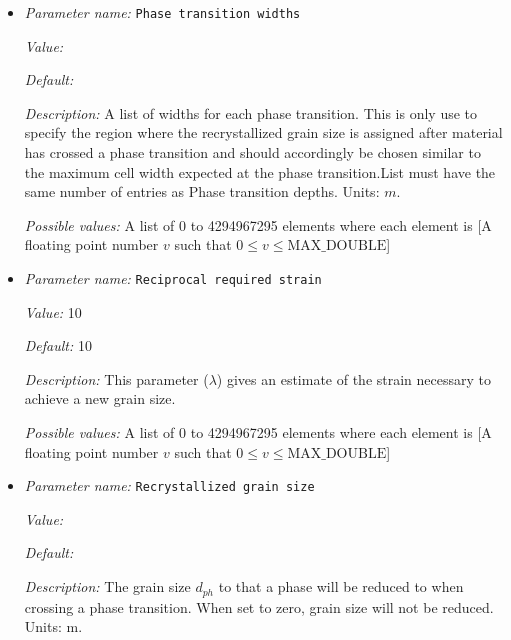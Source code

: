 \begin{itemize}
{\it Possible values:} A list of 0 to 4294967295 elements where each element is [A floating point number $v$ such that $0 \leq v \leq \text{MAX\_DOUBLE}$]
\item {\it Parameter name:} {\tt Phase transition widths}
\label{parameters:Material model/Grain size model/Phase transition widths}


{\it Value:} 


{\it Default:} 


{\it Description:} A list of widths for each phase transition. This is only use to specify the region where the recrystallized grain size is assigned after material has crossed a phase transition and should accordingly be chosen similar to the maximum cell width expected at the phase transition.List must have the same number of entries as Phase transition depths. Units: $m$.


{\it Possible values:} A list of 0 to 4294967295 elements where each element is [A floating point number $v$ such that $0 \leq v \leq \text{MAX\_DOUBLE}$]
\item {\it Parameter name:} {\tt Reciprocal required strain}
\label{parameters:Material model/Grain size model/Reciprocal required strain}


{\it Value:} 10


{\it Default:} 10


{\it Description:} This parameter ($\lambda$) gives an estimate of the strain necessary to achieve a new grain size. 


{\it Possible values:} A list of 0 to 4294967295 elements where each element is [A floating point number $v$ such that $0 \leq v \leq \text{MAX\_DOUBLE}$]
\item {\it Parameter name:} {\tt Recrystallized grain size}
\label{parameters:Material model/Grain size model/Recrystallized grain size}


{\it Value:} 


{\it Default:} 


{\it Description:} The grain size $d_{ph}$ to that a phase will be reduced to when crossing a phase transition. When set to zero, grain size will not be reduced. Units: m.



\end{itemize}
